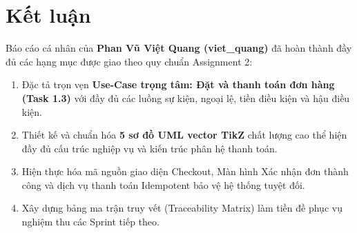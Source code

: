 \documentclass[a4paper]{article}
\begin{document}
\section{Kết luận}
Báo cáo cá nhân của \textbf{Phan Vũ Việt Quang (viet\_quang)} đã hoàn thành đầy đủ các hạng mục được giao theo quy chuẩn Assignment 2:
\begin{enumerate}
    \item Đặc tả trọn vẹn \textbf{Use-Case trọng tâm: Đặt và thanh toán đơn hàng (Task 1.3)} với đầy đủ các luồng sự kiện, ngoại lệ, tiền điều kiện và hậu điều kiện.
    \item Thiết kế và chuẩn hóa \textbf{5 sơ đồ UML vector TikZ} chất lượng cao thể hiện đầy đủ cấu trúc nghiệp vụ và kiến trúc phân hệ thanh toán.
    \item Hiện thực hóa mã nguồn giao diện Checkout, Màn hình Xác nhận đơn thành công và dịch vụ thanh toán Idempotent bảo vệ hệ thống tuyệt đối.
    \item Xây dựng bảng ma trận truy vết (Traceability Matrix) làm tiền đề phục vụ nghiệm thu các Sprint tiếp theo.
\end{enumerate}
\end{document}
